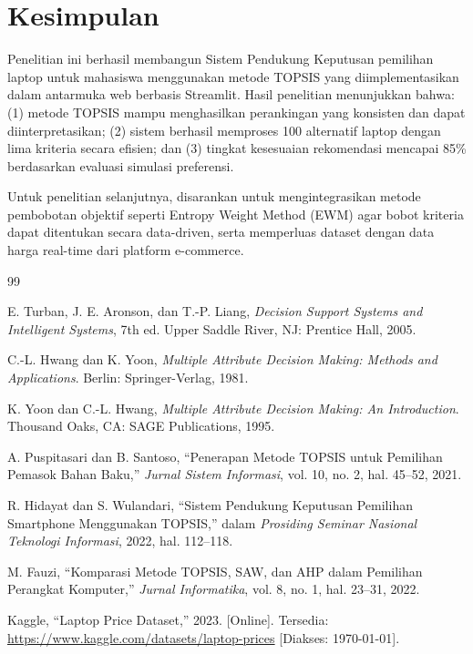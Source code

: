 \documentclass[10pt, a4paper, twocolumn]{article}
\begin{document}
\section{Kesimpulan}

Penelitian ini berhasil membangun Sistem Pendukung Keputusan pemilihan laptop untuk mahasiswa menggunakan metode TOPSIS yang diimplementasikan dalam antarmuka web berbasis Streamlit. Hasil penelitian menunjukkan bahwa: (1) metode TOPSIS mampu menghasilkan perankingan yang konsisten dan dapat diinterpretasikan; (2) sistem berhasil memproses 100 alternatif laptop dengan lima kriteria secara efisien; dan (3) tingkat kesesuaian rekomendasi mencapai 85\% berdasarkan evaluasi simulasi preferensi.

Untuk penelitian selanjutnya, disarankan untuk mengintegrasikan metode pembobotan objektif seperti Entropy Weight Method (EWM) agar bobot kriteria dapat ditentukan secara data-driven, serta memperluas dataset dengan data harga real-time dari platform e-commerce.


\begin{thebibliography}{99}

E. Turban, J. E. Aronson, dan T.-P. Liang, \textit{Decision Support Systems and Intelligent Systems}, 7th ed. Upper Saddle River, NJ: Prentice Hall, 2005.

C.-L. Hwang dan K. Yoon, \textit{Multiple Attribute Decision Making: Methods and Applications}. Berlin: Springer-Verlag, 1981.

K. Yoon dan C.-L. Hwang, \textit{Multiple Attribute Decision Making: An Introduction}. Thousand Oaks, CA: SAGE Publications, 1995.

A. Puspitasari dan B. Santoso, ``Penerapan Metode TOPSIS untuk Pemilihan Pemasok Bahan Baku,'' \textit{Jurnal Sistem Informasi}, vol. 10, no. 2, hal. 45--52, 2021.

R. Hidayat dan S. Wulandari, ``Sistem Pendukung Keputusan Pemilihan Smartphone Menggunakan TOPSIS,'' dalam \textit{Prosiding Seminar Nasional Teknologi Informasi}, 2022, hal. 112--118.

M. Fauzi, ``Komparasi Metode TOPSIS, SAW, dan AHP dalam Pemilihan Perangkat Komputer,'' \textit{Jurnal Informatika}, vol. 8, no. 1, hal. 23--31, 2022.

Kaggle, ``Laptop Price Dataset,'' 2023. [Online]. Tersedia: \url{https://www.kaggle.com/datasets/laptop-prices} [Diakses: \today].

\end{thebibliography}
\end{document}
